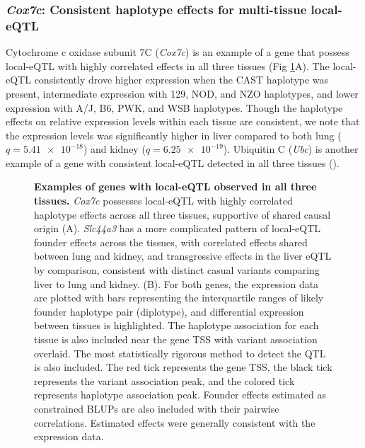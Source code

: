 \documentclass[10pt,letterpaper]{article}
\begin{document}
\subsubsection*{\textit{Cox7c}: Consistent haplotype effects for multi-tissue local-eQTL}
Cytochrome c oxidase subunit 7C (\textit{Cox7c}) is an example of a gene that possess local-eQTL with highly correlated effects in all three tissues (Fig \ref{fig:correlated_local_eqtl}A).
The local-eQTL consistently drove higher expression when the CAST haplotype was present, intermediate expression with 129, NOD, and NZO haplotypes, and lower expression with A/J, B6, PWK, and WSB haplotypes. Though the haplotype effects on relative expression levels within each tissue are consistent, we note that the expression levels was significantly higher in liver compared to both lung ($q = \num{5.41e-18}$) and kidney ($q = \num{6.25e-19}$). Ubiquitin C (\textit{Ubc}) is another example of a gene with consistent local-eQTL detected in all three tissues ().

\begin{figure}[h!]
\caption{\textbf{Examples of genes with local-eQTL observed in all three tissues.} 
\textit{Cox7c} possesses local-eQTL with highly correlated haplotype effects across all three tissues, supportive of shared causal origin (A). \textit{Slc44a3} has a more complicated pattern of local-eQTL founder effects across the tissues, with correlated effects shared between lung and kidney, and transgressive effects in the liver eQTL by comparison, consistent with distinct casual variants comparing liver to lung and kidney. (B). For both genes, the expression data are plotted with bars representing the interquartile ranges of likely founder haplotype pair (diplotype), and differential expression between tissues is highlighted. The haplotype association for each tissue is also included near the gene TSS with variant association overlaid. The most statistically rigorous method to detect the QTL is also included. The red tick represents the gene TSS, the black tick represents the variant association peak, and the colored tick represents haplotype association peak. Founder effects estimated as constrained BLUPs are also included with their pairwise correlations. Estimated effects were generally consistent with the expression data.
\label{fig:correlated_local_eqtl}}
\end{figure}
\end{document}
